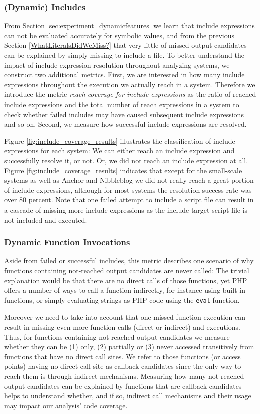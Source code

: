 \documentclass[sigconf]{acmart}
\renewcommand{\sf}[1]{\textsf{#1}}
\begin{document}
\subsubsection{(Dynamic) Includes}
\label{WhyDidIncludesFail}
From Section \ref{sec:experiment_dynamicfeatures} we learn that include
expressions can not be evaluated accurately for symbolic values, and from the
previous Section \ref{WhatLiteralsDidWeMiss?} that very little of missed output
candidates can be explained by simply missing to include a file. To better
understand the impact of include expression resolution throughout analyzing
systems, we construct two additional metrics. First, we are interested in how
many include expressions throughout the execution we actually reach in a system.
Therefore we introduce the metric \emph{reach coverage for include expressions}
as the ratio of reached include expressions and the total number of reach
expressions in a system to check whether failed includes may have caused
subsequent include expressions and so on. Second, we measure how successful
include expressions are resolved. 

Figure \ref{fig:include_coverage_results} illustrates the classification of
include expressions for each system: We can either reach an include expression
and successfully resolve it, or not. Or, we did not reach an include expression at all. 
Figure \ref{fig:include_coverage_results} indicates that except for the
small-scale systems as well as \sf{Anchor} and \sf{Nibbleblog} we did not really
reach a great portion of include expressions, although for most systems the
resolution success rate was over 80 percent. Note that one failed attempt
to include a script file can result in a cascade of missing more include
expressions as the include target script file is not included and executed.

\subsubsection{Dynamic Function Invocations}
\label{WhyDidFunctionCallsFail}
Aside from failed or successful includes, this metric describes one scenario of
why functions containing not-reached output candidates are never called: The
trivial explanation would be that there are no direct calls of those functions,
yet PHP offers a number of ways to call a function indirectly, for instance
using built-in functions, or simply evaluating strings as PHP code using the
\texttt{eval} function.

Moreover we need to take into account that one missed function execution can
result in missing even more function calls (direct or indirect) and executions.
Thus, for functions containing not-reached output candidates we measure whether
they can be (1) only, (2) partially or (3) never accessed transitively from
functions that have no direct call sites. We refer to those functions (or
access points) having no direct call site as callback candidates since the only
way to reach them is through indirect mechanisms. Measuring how many
not-reached output candidates can be explained by functions that are callback
candidates helps to understand whether, and if so, indirect call mechanisms and
their usage may impact our analysis’ code coverage.
\end{document}

